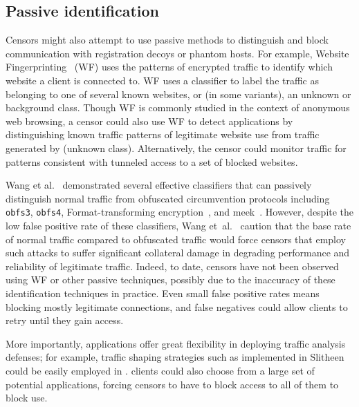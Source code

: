 \documentclass[sigconf,anonymous]{acmart}
\begin{document}

\subsection{Passive identification}
Censors might also attempt to use passive methods to distinguish and block communication
with registration decoys or phantom hosts. For example, 
Website Fingerprinting~\cite{wang2014effective,hayes2016k,sirinam2018deep} (WF)
uses the patterns of encrypted traffic to identify which website a client is
connected to. WF uses a classifier to label the traffic as belonging to one of
several known websites, or (in some variants), an unknown or background class.
Though WF is commonly studied in the context of anonymous web browsing, a censor
could also use WF to detect \scheme applications by distinguishing known traffic
patterns of legitimate website use from traffic generated by \scheme (unknown
class). Alternatively, the censor could monitor traffic for patterns consistent
with tunneled access to a set of blocked websites.

Wang et al.~\cite{wang2015seeing} demonstrated several effective classifiers
that can passively distinguish normal traffic from obfuscated circumvention
protocols including \texttt{obfs3}, \texttt{obfs4}, Format-transforming
encryption~\cite{fte}, and meek~\cite{meek}. However, despite the low false
positive rate of these classifiers, Wang et~al.~\cite{wang2015seeing} caution
that the base rate of normal traffic compared to obfuscated traffic would force
censors that employ such attacks to suffer significant collateral damage in
degrading performance and reliability of legitimate traffic.
Indeed, to date, censors have not been observed using WF or other
passive techniques, possibly due to the inaccuracy of these identification
techniques in practice. Even small false positive rates means blocking mostly legitimate
connections, and false negatives could allow clients to retry until they gain
access.


More importantly, \scheme applications offer great flexibility in deploying
traffic analysis defenses; for example, traffic shaping strategies such as
implemented in Slitheen~\cite{slitheen16} could be easily employed in \scheme.
\scheme clients could also choose from a large set of potential applications,
forcing censors to have to block access to all of them to block use.
\end{document}

